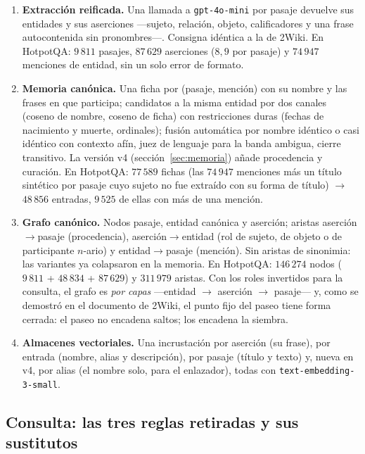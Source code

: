 \documentclass[11pt,a4paper]{article}
\begin{document}
\begin{enumerate}[leftmargin=1.6em, itemsep=1pt]
\item \textbf{Extracción reificada.} Una llamada a \texttt{gpt-4o-mini} por
  pasaje devuelve sus entidades y sus aserciones ---sujeto, relación, objeto,
  calificadores y una frase autocontenida sin pronombres---. Consigna
  idéntica a la de 2Wiki. En HotpotQA: $9\,811$ pasajes, $87\,629$
  aserciones ($8{,}9$ por pasaje) y $74\,947$ menciones de entidad, sin un
  solo error de formato.
\item \textbf{Memoria canónica.} Una ficha por (pasaje, mención) con su
  nombre y las frases en que participa; candidatos a la misma entidad por dos
  canales (coseno de nombre, coseno de ficha) con restricciones duras
  (fechas de nacimiento y muerte, ordinales); fusión automática por nombre
  idéntico o casi idéntico con contexto afín, juez de lenguaje para la banda
  ambigua, cierre transitivo. La versión v4 (sección~\ref{sec:memoria}) añade
  procedencia y curación. En HotpotQA: $77\,589$ fichas (las $74\,947$
  menciones más un título sintético por pasaje cuyo sujeto no fue extraído
  con su forma de título) $\to$ $48\,856$ entradas, $9\,525$ de ellas con más
  de una mención.
\item \textbf{Grafo canónico.} Nodos pasaje, entidad canónica y aserción;
  aristas aserción$\to$pasaje (procedencia), aserción$\to$entidad (rol de
  sujeto, de objeto o de participante $n$-ario) y entidad$\to$pasaje
  (mención). Sin aristas de sinonimia: las variantes ya colapsaron en la
  memoria. En HotpotQA: $146\,274$ nodos ($9\,811$ + $48\,834$ + $87\,629$) y
  $311\,979$ aristas. Con los roles invertidos para la consulta, el grafo es
  \emph{por capas} ---entidad $\to$ aserción $\to$ pasaje--- y, como se
  demostró en el documento de 2Wiki, el punto fijo del paseo tiene forma
  cerrada: el paseo no encadena saltos; los encadena la siembra.
\item \textbf{Almacenes vectoriales.} Una incrustación por aserción (su
  frase), por entrada (nombre, alias y descripción), por pasaje (título y
  texto) y, nueva en v4, por alias (el nombre solo, para el enlazador),
  todas con \texttt{text-embedding-3-small}.
\end{enumerate}

\subsection{Consulta: las tres reglas retiradas y sus sustitutos}
\label{sec:consulta}
\end{document}

